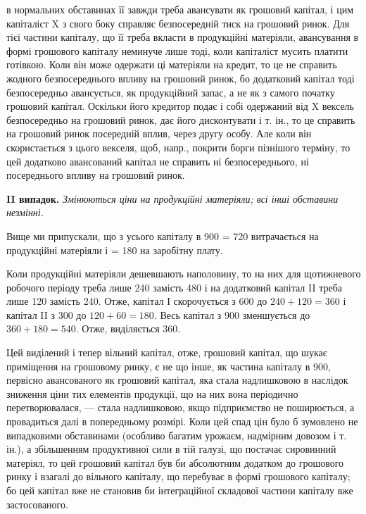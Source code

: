 \parcont{}  %
в нормальних обставинах її завжди треба авансувати як грошовий капітал,
і цим капіталіст X з свого боку справляє безпосередній тиск на грошовий
ринок. Для тієї частини капіталу, що її треба вкласти в продукційні
матеріяли, авансування в формі грошового капіталу неминуче лише
тоді, коли капіталіст мусить платити готівкою. Коли він може одержати
ці матеріяли на кредит, то це не справить жодного безпосереднього
впливу на грошовий ринок, бо додатковий капітал тоді безпосередньо
авансується, як продукційний запас, а не як з самого початку грошовий
капітал. Оскільки його кредитор подає і собі одержаний від X вексель
безпосередньо на грошовий ринок, дає його дисконтувати і т. ін., то це
справить на грошовий ринок посередній вплив, через другу особу. Але
коли він скористається з цього векселя, щоб, напр., покрити борги пізнішого
терміну, то цей додатково авансований капітал не справить ні
безпосереднього, ні посереднього впливу на грошовий ринок.

\textbf{II випадок.} \emph{Змінюються ціни на продукційні матеріяли; всі інші
обставини незмінні.}

Вище ми припускали, що з усього капіталу в 900  = 720 витрачається на продукційні матеріяли і  = 180 на заробітну
плату.

Коли продукційні матеріяли дешевшають наполовину, то на них для
щотижневого робочого періоду треба лише 240 замість 480 і на додатковий капітал II треба лише 120 замість
240. Отже, капітал І скорочується з 600 до $240 +
120 = 360$ і капітал II з 300 до $120 + 60 = 180$. Весь капітал з 900 зменшується до $360 + 180 = 540$. Отже, виділяється 360.

Цей виділений і тепер вільний капітал, отже, грошовий капітал, що
шукає приміщення на грошовому ринку, є не що інше, як частина капіталу
в 900, первісно авансованого як грошовий капітал, яка
стала надлишковою в наслідок зниження ціни тих елементів продукції,
що на них вона періодично перетворювалася, — стала надлишковою,
якщо підприємство не поширюється, а провадиться далі в попередньому
розмірі. Коли цей спад цін було б зумовлено не випадковими обставинами
(особливо багатим урожаєм, надмірним довозом і т. ін.), а збільшенням
продуктивної сили в тій галузі, що постачає сировинний матеріял,
то цей грошовий капітал був би абсолютним додатком до грошового
ринку і взагалі до вільного капіталу, що перебуває в формі грошового
капіталу; бо цей капітал вже не становив би інтеграційної складової частини
капіталу вже застосованого.


